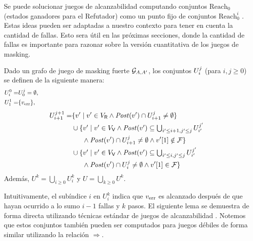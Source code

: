 Se puede solucionar juegos de alcanzabilidad computando conjuntos $\text{Reach}_0$ (estados ganadores para el Refutador) como un punto fijo de conjuntos $\text{Reach}^i_0$  \cite{Jurd11}.
Estas ideas pueden ser adaptadas a nuestro contexto para tener en cuenta la cantidad de fallas. Esto sera útil en las próximas secciones, donde la cantidad de fallas es importante para razonar sobre la versión cuantitativa de los juegos de masking.
\begin{definition}\label{def:U} Dado un grafo de juego de masking fuerte $\StrMaskGG$, 
los conjuntos $\setsUs$ (para $i,j \geq 0$) se definen de la siguiente manera:
\begin{align*}
  U^0_i =& U^j_0 = \emptyset,  \label{def:of:Uji} \\
  U_1^1 =&  \{\ErrorSt\},
  \hspace{12.5cm} {}\notag
\end{align*}
\begin{align*}
  U_{i+1}^{j+1} =&
    \{v' \mid v' \in V_\Refuter \wedge \post(v') \cap U_{i+1}^j \neq \emptyset\} \\
    &\textstyle\cup
    \{v' \mid v' \in V_\Verifier \wedge \post(v') \subseteq \bigcup_{i'\leq i+1, j' \leq j}U_{i'}^{j'} \\
    &\phantom{==}\wedge \post(v') \cap U^j_{i+1} \neq \emptyset \wedge \pr{1}{v'} \notin \Faults \} \\
    &\textstyle \cup
    \{v' \mid  v' \in V_\Verifier \wedge \post(v') \subseteq \bigcup_{i'\leq i, j' \leq j}U_{i'}^{j'} \\
    &\phantom{==}\wedge \post(v') \cap \setsUs \neq \emptyset \wedge \pr{1}{v'} \in \Faults \}
\end{align*}
Además, $U^k = \bigcup_{i \geq 0} U_i^k$ y $U = \bigcup_{k \geq 0} U^k$.
\end{definition}
Intuitivamente, el subíndice $i$ en $U^k_i$ indica que $\ErrorSt$ es alcanzado después de que hayan ocurrido a lo sumo $i-1$ fallas y $k$ pasos.
El siguiente lema se demuestra de forma directa utilizando técnicas estándar de juegos de alcanzabilidad \cite{AlfaroHK07}.
Notemos que estos conjuntos también pueden ser computados para juegos débiles de forma similar utilizando la relación $\Rightarrow$.

